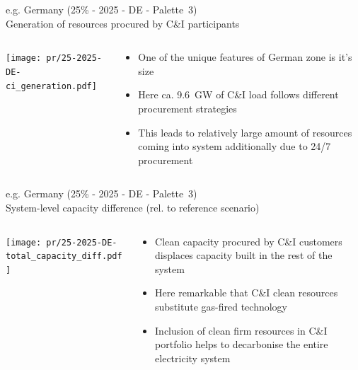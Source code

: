 \begin{frame}{e.g. Germany (25\% - 2025 - DE - Palette~3) 
\\ Generation of resources procured by C\&I participants}

\begin{columns}[T]
\begin{column}{9cm}
\centering

\texttt{[image: pr/25-2025-DE-ci\_generation.pdf]}
\end{column}
\begin{column}{5cm}

  \begin{itemize}
  \item  One of the unique features of German zone is it's size
  \item Here ca. \alert{9.6~GW} of C\&I load follows different procurement strategies
  \item This leads to relatively \alert{large amount of resources coming into system additionally} due to 24/7 procurement
  \end{itemize}
  
\end{column}
\end{columns}

\end{frame}



\begin{frame}{e.g. Germany (25\% - 2025 - DE - Palette~3) 
\\ System-level capacity difference (rel. to reference scenario)}

\begin{columns}[T]
\begin{column}{9cm}
\centering

\texttt{[image: pr/25-2025-DE-total\_capacity\_diff.pdf]}
\end{column}
\begin{column}{5cm}

  \begin{itemize}
  \item  Clean capacity procured by C\&I customers displaces capacity built in the rest of the system 
  \item Here remarkable that \alert{C\&I clean resources substitute gas-fired technology}
  \item Inclusion of clean firm resources in C\&I portfolio \alert{helps to decarbonise} the entire electricity system
  \end{itemize}
  
\end{column}
\end{columns}

\end{frame}


